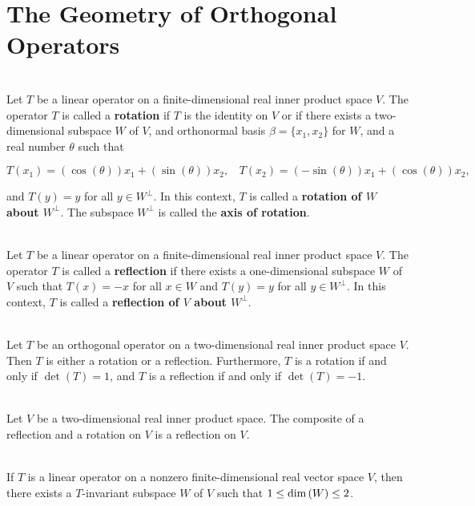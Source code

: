 \section{The Geometry of Orthogonal Operators}

\begin{definition}
	\hfill\\
	Let $T$ be a linear operator on a finite-dimensional real inner product space $V$. The operator $T$ is called a \textbf{rotation} if $T$ is the identity on $V$ or if there exists a two-dimensional subspace $W$ of $V$, and orthonormal basis $\beta = \{x_1, x_2\}$ for $W$, and a real number $\theta$ such that

	\[T(x_1) = (\cos(\theta))x_1 + (\sin(\theta))x_2,\ \ \ \ T(x_2) = (-\sin(\theta))x_1 + (\cos(\theta))x_2,\]

	and $T(y) = y$ for all $y \in W^\perp$. In this context, $T$ is called a \textbf{rotation of $W$ about $W^\perp$}. The subspace $W^\perp$ is called the \textbf{axis of rotation}.
\end{definition}

\begin{definition}
	\hfill\\
	Let $T$ be a linear operator on a finite-dimensional real inner product space $V$. The operator $T$ is called a \textbf{reflection} if there exists a one-dimensional subspace $W$ of $V$ such that $T(x) = -x$ for all $x \in W$ and $T(y) = y$ for all $y \in W^\perp$. In this context, $T$ is called a \textbf{reflection of $V$ about $W^\perp$}.
\end{definition}

\begin{theorem}
	\hfill\\
	Let $T$ be an orthogonal operator on a two-dimensional real inner product space $V$. Then $T$ is either a rotation or a reflection. Furthermore, $T$ is a rotation if and only if $\det(T) = 1$, and $T$ is a reflection if and only if $\det(T) = -1$.
\end{theorem}

\begin{corollary}
	\hfill\\
	Let $V$ be a two-dimensional real inner product space. The composite of a reflection and a rotation on $V$ is a reflection on $V$.
\end{corollary}

\begin{lemma}
	\hfill\\
	If $T$ is a linear operator on a nonzero finite-dimensional real vector space $V$, then there exists a $T$-invariant subspace $W$ of $V$ such that $1 \leq \text{dim}\left(W\right) \leq 2$.
\end{lemma}

